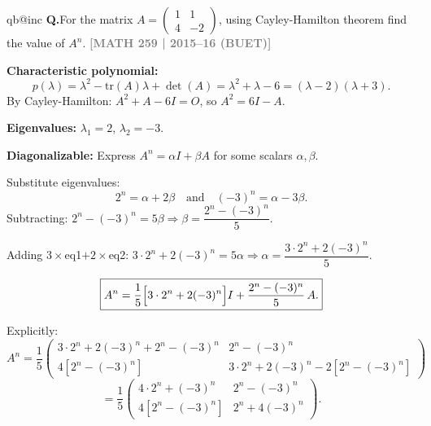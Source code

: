 \documentclass[12pt,a3paper]{article}
\makeatletter
\newcommand{\yr}[1]{\hfill\textcolor{gray}{\small\textbf{[#1]}}}
\newcounter{qnum}
\newcommand{\Q}[1]{%
  \csname qb@inc\endcsname
  \needspace{4\baselineskip}
  \refstepcounter{qnum}
  \vspace{6pt}
  \noindent\textbf{Q\theqnum.}\enspace #1\par
}
\makeatother
\begin{document}
\Q{For the matrix $A = \begin{pmatrix} 1 & 1 \\ 4 & -2 \end{pmatrix}$, using Cayley-Hamilton theorem find the value of $A^n$.
\yr{MATH 259 | 2015--16 (BUET)}}

\begin{tcolorbox}[enhanced,breakable,
  colback=cA!4,colframe=cA,boxrule=0.8pt,arc=5pt,
  title={\textbf{Answer --- Cayley-Hamilton: $A^n$ for $A=\begin{pmatrix}1&1\\4&-2\end{pmatrix}$}},
  fonttitle=\bfseries\color{white},colbacktitle=cA]
 
\textbf{Characteristic polynomial:}
\[
p(\lambda) = \lambda^2 - \mathrm{tr}(A)\lambda + \det(A) = \lambda^2 + \lambda - 6 = (\lambda-2)(\lambda+3).
\]
By Cayley-Hamilton: $A^2 + A - 6I = O$, so $A^2 = 6I - A$.
 
\textbf{Eigenvalues:} $\lambda_1=2$, $\lambda_2=-3$.
 
\textbf{Diagonalizable:} Express $A^n = \alpha I + \beta A$ for some scalars $\alpha,\beta$.
 
Substitute eigenvalues:
\[
2^n = \alpha + 2\beta \quad\text{and}\quad (-3)^n = \alpha - 3\beta.
\]
Subtracting: $2^n - (-3)^n = 5\beta \Rightarrow \beta = \dfrac{2^n-(-3)^n}{5}$.
 
Adding $3\times$eq1$+2\times$eq2: $3\cdot2^n + 2(-3)^n = 5\alpha \Rightarrow \alpha = \dfrac{3\cdot2^n+2(-3)^n}{5}$.
 
\[
\boxed{A^n = \frac{1}{5}\Bigl[3\cdot2^n+2(-3)^n\Bigr]I + \frac{2^n-(-3)^n}{5}\,A.}
\]
 
Explicitly:
\[
A^n = \frac{1}{5}\begin{pmatrix}3\cdot2^n+2(-3)^n + 2^n-(-3)^n & 2^n-(-3)^n\\ 4[2^n-(-3)^n] & 3\cdot2^n+2(-3)^n-2[2^n-(-3)^n]\end{pmatrix}
\]
\[
= \frac{1}{5}\begin{pmatrix}4\cdot2^n+(-3)^n & 2^n-(-3)^n\\ 4[2^n-(-3)^n] & 2^n+4(-3)^n\end{pmatrix}.
\]
 
\end{tcolorbox}
 
\end{document}
